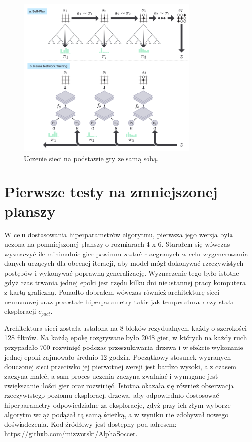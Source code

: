 \documentclass[licencjacka]{pracamgr}
\begin{document}
\begin{figure}[ht!]
  \centering
  \includegraphics[width=0.8\textwidth]{alphago-self-play}
  \caption{Uczenie sieci na podstawie gry ze samą sobą. \cite{alphagozero}}
\end{figure}

\newpage

\section{Pierwsze testy na zmniejszonej planszy}

W celu dostosowania hiperparametrów algorytmu, pierwsza jego wersja była uczona na pomniejszonej planszy o rozmiarach 4 x 6. Starałem się wówczas wyznaczyć ile minimalnie gier powinno zostać rozegranych w celu wygenerowania danych uczących dla obecnej iteracji, aby model mógł dokonywać rzeczywistych postępów i wykonywać poprawną generalizację. Wyznaczenie tego było istotne gdyż czas trwania jednej epoki jest rzędu kilku dni nieustannej pracy komputera z kartą graficzną. Ponadto dobrałem wówczas również architekturę sieci neuronowej oraz pozostałe hiperparametry takie jak temperatura $\tau$ czy stała eksploracji $c_{puct}$.

Architektura sieci została ustalona na 8 bloków rezydualnych, każdy o szerokości 128 filtrów. Na każdą epokę rozgrywane było 2048 gier, w których na każdy ruch przypadało 700 rozwinięć podczas przeszukiwania drzewa i w efekcie wykonanie jednej epoki zajmowało średnio 12 godzin. Początkowy stosunek wygranych douczonej sieci przeciwko jej pierwotnej wersji jest bardzo wysoki, a z czasem zaczyna maleć, a sam proces uczenia zaczyna zwalniać i wymagane jest zwiększanie ilości gier oraz rozwinięć. Istotna okazała się również obserwacja rzeczywistego poziomu eksploracji drzewa, aby odpowiednio dostosować hiperparametry odpowiedzialne za eksploracje, gdyż przy ich złym wyborze algorytm wciąż podążał tą samą ścieżką, a w wyniku nie zdobywał nowego doświadczenia. Kod źródłowy jest dostępny pod adresem: https://github.com/mizworski/AlphaSoccer.
\end{document}
